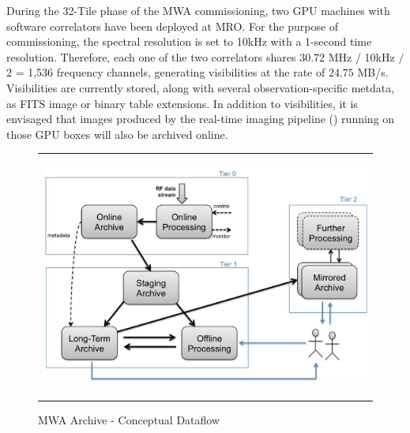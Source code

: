 \documentclass[11pt,twoside]{article}
\begin{document}
During the 32-Tile phase of the MWA commissioning, two GPU machines with software correlators have been deployed at MRO. For the purpose of commissioning, the spectral resolution is set to 10kHz with a 1-second time resolution. Therefore, each one of the two correlators shares 30.72 MHz \(/\) 10kHz \(/\) 2 = 1,536 frequency channels, generating visibilities at the rate of \(24.75\) MB/s. Visibilities are currently stored, along with several observation-specific metdata, as FITS image or binary table extensions. In addition to visibilities, it is envisaged that images produced by the real-time imaging pipeline (\cite{ord2010interferometric}) running on those GPU boxes will also be archived online.
   \begin{figure}
   \begin{center}
   \begin{tabular}{c}
   \includegraphics[height=8cm]{P34_f1.eps}
   \end{tabular}
   \end{center}
   \caption[example] 
   { \label{fig:con_dataflow} 
MWA Archive - Conceptual Dataflow}
   \end{figure} 
\end{document}
